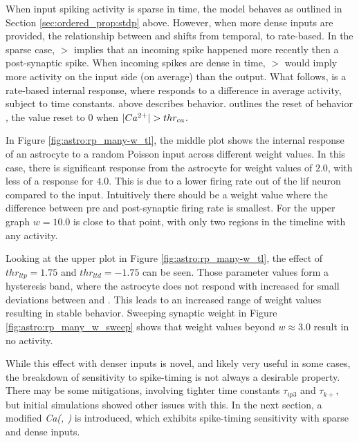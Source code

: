 When input spiking activity is sparse in time, the model behaves as outlined
in Section \ref{sec:ordered_prop:stdp} above. However, when more dense
inputs are provided, the relationship between \ipt and \kp shifts from
temporal, to rate-based. In the sparse case, \ipt $>$ \kp implies that an
incoming spike happened more recently then a post-synaptic spike. When
incoming spikes are dense in time, \ipt $>$ \kp would imply more activity on
the input side (on average) than the output. What follows, is a rate-based
internal response, where \ca responds to a difference in average activity,
subject to time constants.  above describes \ca
behavior.  outlines the reset of behavior \ca,
the value reset to $0$ when $|Ca^{2+}| > thr_{ca}$.

In Figure \ref{fig:astro:rp_many-w_tl}, the middle plot shows the internal
response of an astrocyte to a random Poisson input across different weight values. In
this case, there is significant response from the astrocyte for weight values of
$2.0$, with less of a response for $4.0$. This is due to a lower firing rate out
of the \gls{lif} neuron compared to the input. Intuitively there should be a weight
value where the difference between pre and post-synaptic firing rate is
smallest. For the upper graph $w=10.0$ is close to that point, with only two
regions in the timeline with any activity.


Looking at the upper plot in Figure \ref{fig:astro:rp_many-w_tl}, the effect of
$thr_{ltp}=1.75$ and $thr_{ltd}=-1.75$ can be seen. Those parameter values form
a hysteresis band, where the astrocyte does not respond with increased \ca for
small deviations between \ipt and \kp. This leads to an increased range of
weight values resulting in stable behavior. Sweeping synaptic weight in Figure
\ref{fig:astro:rp_many_w_sweep} shows that weight values beyond $w \approx 3.0$
result in no \ca activity.


While this effect with denser inputs is novel, and likely very useful in some
cases, the breakdown of sensitivity to spike-timing is not always a desirable
property. There may be some mitigations, involving tighter time constants
$\tau_{ip3}$ and $\tau_{k+}$, but initial simulations showed other issues with
this. In the next section, a modified \emph{Ca(\ipt, \kp\!)} is introduced, which
exhibits spike-timing sensitivity with sparse and dense inputs.

